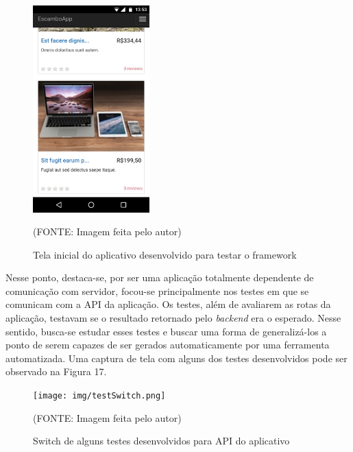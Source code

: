 \documentclass[
    12pt,       %
    openright,      %
    twoside,      %
    a4paper,      %
    english,      %
    french,       %
    spanish,      %
    brazil,       %
    ]{abntex2}
\begin{document}
    \begin{figure}[!htbp]
      \begin{center}
        \includegraphics[width=0.4\textwidth]{img/escamboapp.png}
      \end{center}
      \caption{\label{fig:passaro} Tela inicial do aplicativo desenvolvido para testar o framework}
      \begin{center}(FONTE: Imagem feita pelo autor)\end{center}
    \end{figure}

    Nesse ponto, destaca-se, por ser uma aplicação totalmente dependente de comunicação com servidor,
    focou-se principalmente nos testes em que se comunicam com a API da aplicação. Os testes, além de
    avaliarem as rotas da aplicação, testavam se o resultado retornado pelo \textit{backend} era o esperado.
    Nesse sentido, busca-se estudar esses testes e buscar uma forma de generalizá-los a ponto de serem
    capazes de ser gerados automaticamente por uma ferramenta automatizada. Uma captura de tela com
    alguns dos testes desenvolvidos pode ser observado na Figura 17.

    \begin{figure}[!htbp]
      \begin{center}
        \texttt{[image: img/testSwitch.png]}
      \end{center}
      \caption{\label{fig:passaro} Switch de alguns testes desenvolvidos para API do aplicativo}
      \begin{center}(FONTE: Imagem feita pelo autor)\end{center}
    \end{figure}
\end{document}
